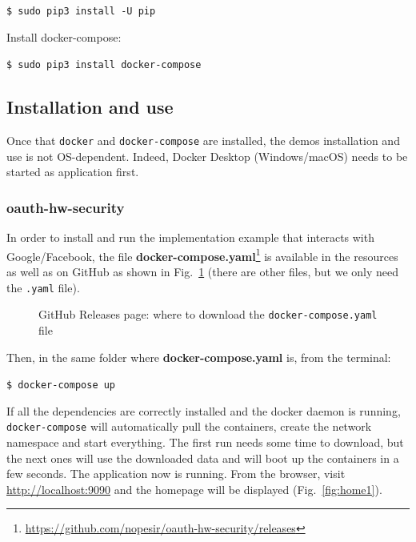 \documentclass[a4paper,12pt]{article}
\def\myfig#1{Fig.~#1\xspace}
\begin{document}
\quad \texttt{\$ sudo pip3 install -U pip}

Install docker-compose:
  
\quad \texttt{\$ sudo pip3 install docker-compose}

\subsection{Installation and use}
Once that \texttt{docker} and \texttt{docker-compose} are installed, the demos installation and use is not OS-dependent. Indeed, Docker Desktop (Windows/macOS) needs to be started as application first.

\subsubsection{oauth-hw-security}
In order to install and run the implementation example that interacts with Google/Facebook, the file \textbf{docker-compose.yaml}\footnote{\url{https://github.com/nopesir/oauth-hw-security/releases}} is available in the resources as well as on GitHub as shown in \myfig{\ref{fig:rel1}} (there are other files, but we only need the \texttt{.yaml} file).

\begin{figure}[ht]
    \centering
    \caption{GitHub Releases page: where to download the \texttt{docker-compose.yaml} file}
    \label{fig:rel1}
\end{figure}

Then, in the same folder where \textbf{docker-compose.yaml} is, from the terminal:

\quad \texttt{\$ docker-compose up}

If all the dependencies are correctly installed and the docker daemon is running, \texttt{docker-compose} will automatically pull the containers, create the network namespace and start everything. The first run needs some time to download, but the next ones will use the downloaded data and will boot up the containers in a few seconds. The application now is running. From the browser, visit \url{http://localhost:9090} and the homepage will be displayed (\myfig{\ref{fig:home1}}).
\end{document}
